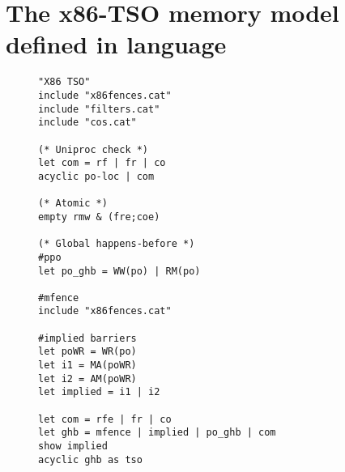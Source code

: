 \section{The x86-TSO memory model defined in \cat{} language}
\label{apx:x86cat}

\begin{figure}[h]
\begin{lstlisting}
"X86 TSO"
include "x86fences.cat"
include "filters.cat"
include "cos.cat"

(* Uniproc check *)
let com = rf | fr | co
acyclic po-loc | com

(* Atomic *)
empty rmw & (fre;coe)

(* Global happens-before *)
#ppo
let po_ghb = WW(po) | RM(po)

#mfence
include "x86fences.cat"

#implied barriers
let poWR = WR(po)
let i1 = MA(poWR)
let i2 = AM(poWR)
let implied = i1 | i2

let com = rfe | fr | co
let ghb = mfence | implied | po_ghb | com
show implied
acyclic ghb as tso
\end{lstlisting}
\end{figure}
